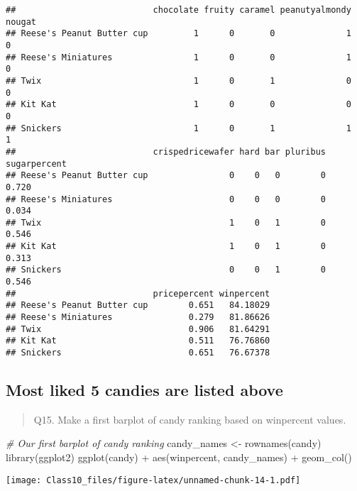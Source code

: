 \documentclass[
]{article}
\newenvironment{Shaded}{\begin{snugshade}}{\end{snugshade}}
\newcommand{\CommentTok}[1]{\textcolor[rgb]{0.56,0.35,0.01}{\textit{#1}}}
\newcommand{\FunctionTok}[1]{\textcolor[rgb]{0.00,0.00,0.00}{#1}}
\newcommand{\NormalTok}[1]{#1}
\newcommand{\OtherTok}[1]{\textcolor[rgb]{0.56,0.35,0.01}{#1}}
\newcommand{\SpecialCharTok}[1]{\textcolor[rgb]{0.00,0.00,0.00}{#1}}
\begin{document}
\begin{verbatim}
##                           chocolate fruity caramel peanutyalmondy nougat
## Reese's Peanut Butter cup         1      0       0              1      0
## Reese's Miniatures                1      0       0              1      0
## Twix                              1      0       1              0      0
## Kit Kat                           1      0       0              0      0
## Snickers                          1      0       1              1      1
##                           crispedricewafer hard bar pluribus sugarpercent
## Reese's Peanut Butter cup                0    0   0        0        0.720
## Reese's Miniatures                       0    0   0        0        0.034
## Twix                                     1    0   1        0        0.546
## Kit Kat                                  1    0   1        0        0.313
## Snickers                                 0    0   1        0        0.546
##                           pricepercent winpercent
## Reese's Peanut Butter cup        0.651   84.18029
## Reese's Miniatures               0.279   81.86626
## Twix                             0.906   81.64291
## Kit Kat                          0.511   76.76860
## Snickers                         0.651   76.67378
\end{verbatim}

\hypertarget{most-liked-5-candies-are-listed-above}{%
\subsection{Most liked 5 candies are listed
above}\label{most-liked-5-candies-are-listed-above}}

\begin{quote}
Q15. Make a first barplot of candy ranking based on winpercent values.
\end{quote}

\begin{Shaded}
\begin{Highlighting}[]
\CommentTok{\# Our first barplot of candy ranking}
\NormalTok{candy\_names }\OtherTok{\textless{}{-}} \FunctionTok{rownames}\NormalTok{(candy)}
\FunctionTok{library}\NormalTok{(ggplot2)}
\FunctionTok{ggplot}\NormalTok{(candy) }\SpecialCharTok{+} \FunctionTok{aes}\NormalTok{(winpercent, candy\_names) }\SpecialCharTok{+} \FunctionTok{geom\_col}\NormalTok{()}
\end{Highlighting}
\end{Shaded}

\texttt{[image: Class10\_files/figure-latex/unnamed-chunk-14-1.pdf]}
\end{document}

